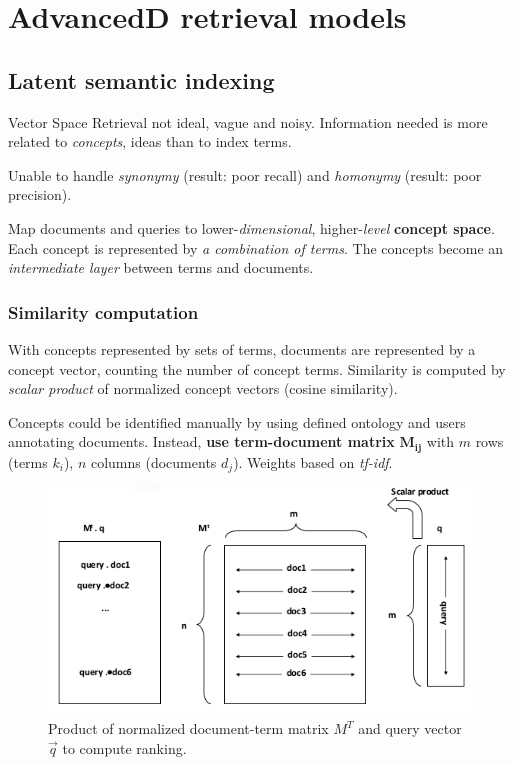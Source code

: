 \section{AdvancedD retrieval models}
\subsection{Latent semantic indexing}
Vector Space Retrieval not ideal, vague and noisy. Information needed is more related to \emph{concepts}, ideas than to index terms.

Unable to handle \emph{synonymy} (result: poor recall) and \emph{homonymy} (result: poor precision).

Map documents and queries to lower-\emph{dimensional}, higher-\emph{level} \textbf{concept space}. Each concept is represented by \emph{a combination of terms}. The concepts become an \emph{intermediate layer} between terms and documents.

\subsubsection{Similarity computation} With concepts represented by sets of terms, documents are represented by a concept vector, counting the number of concept terms. Similarity is computed by \emph{scalar product} of normalized concept vectors (cosine similarity).

Concepts could be identified manually by using defined ontology and users annotating documents. Instead, \textbf{use term-document matrix} $\mathbf{M_{ij}}$ with $m$ rows (terms $k_i$), $n$ columns (documents $d_j$). Weights based on \emph{tf-idf}.

\begin{figure}
  \centering
  \includegraphics[width=\linewidth]{figures/computing_ranking.png}
  \caption{Product of normalized document-term matrix $M^T$ and query vector $\vec{q}$ to compute ranking.}
  \label{fig:computing_ranking}
\end{figure}

